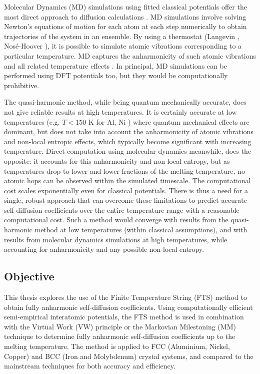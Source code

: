 \documentclass{article}
\begin{document}
Molecular Dynamics (MD) simulations using fitted classical potentials offer the most direct approach to diffusion calculations \cite{Kaur1995}. MD simulations involve solving Newton's equations of motion for each atom at each step numerically to obtain trajectories of the system in an ensemble. By using a thermostat (Langevin \cite{Davidchack2009}, Nosé-Hoover \cite{Evans1985}), it is possible to simulate atomic vibrations corresponding to a particular temperature. MD captures the anharmonicity of such atomic vibrations and all related temperature effects \cite{Mendelev2009}. In principal, MD simulations can be performed using DFT potentials too, but they would be computationally prohibitive.

The quasi-harmonic method, while being quantum mechanically accurate, does not give reliable results at high temperatures. It is certainly accurate at low temperatures (e.g. $T<150 $ K for Al, Ni \cite{Maradudin1963}) where quantum mechanical effects are dominant, but does not take into account the anharmonicity of atomic vibrations and non-local entropic effects, which typically become significant with increasing temperature. Direct computation using molecular dynamics meanwhile, does the opposite: it accounts for this anharmonicity and non-local entropy, but as temperatures drop to lower and lower fractions of the melting temperature, no atomic hops can be observed within the simulated timescale. The computational cost scales exponentially even for classical potentials. There is thus a need for a single, robust approach that can overcome these limitations to predict accurate self-diffusion coefficients over the entire temperature range with a reasonable computational cost. Such a method would converge with results from the quasi-harmonic method at low temperatures (within classical assumptions), and with results from molecular dynamics simulations at high temperatures, while accounting for anharmonicity and any possible non-local entropy. 

\subsection{Objective}

This thesis explores the use of the Finite Temperature String (FTS) method \cite{Vanden-Eijnden2009} to obtain fully anharmonic self-diffusion coefficients. Using computationally efficient semi-empirical interatomic potentials, the FTS method is used in combination with the Virtual Work (VW) principle \cite{Swinburne2017} or the Markovian Milestoning (MM) technique \cite{Vanden-Eijnden2009a} to determine fully anharmonic self-diffusion coefficients up to the melting temperature. The method is applied to FCC (Aluminium, Nickel, Copper) and BCC (Iron and Molybdenum) crystal systems, and compared to the mainstream techniques for both accuracy and efficiency.
\end{document}
